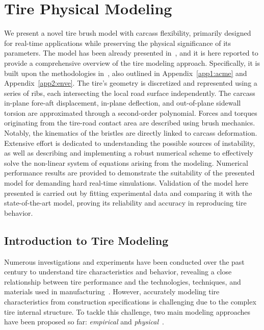 
\chapter{Tire Physical Modeling}
\label{app3:tirex}

We present a novel tire brush model with carcass flexibility, primarily designed for real-time applications while preserving the physical significance of its parameters. The model has been already presented in~\cite{stocco2024physical}, and it is here reported to provide a comprehensive overview of the tire modeling approach. Specifically, it is built upon the methodologies in~\cite{stocco2021acme,stocco2024novel}, also outlined in Appendix~\ref{app1:acme} and Appendix~\ref{app2:enve}. The tire's geometry is discretized and represented using a series of ribs, each intersecting the local road surface independently. The carcass in-plane fore-aft displacement, in-plane deflection, and out-of-plane sidewall torsion are approximated through a second-order polynomial. Forces and torques originating from the tire-road contact area are described using brush mechanics. Notably, the kinematics of the bristles are directly linked to carcass deformation. Extensive effort is dedicated to understanding the possible sources of instability, as well as describing and implementing a robust numerical scheme to effectively solve the non-linear system of equations arising from the modeling. Numerical performance results are provided to demonstrate the suitability of the presented model for demanding hard real-time simulations. Validation of the model here presented is carried out by fitting experimental data and comparing it with the state-of-the-art \MagicFormulae{} model, proving its reliability and accuracy in reproducing tire behavior.


\section{Introduction to Tire Modeling}
\label{app3:sec:introduction}

Numerous investigations and experiments have been conducted over the past century to understand tire characteristics and behavior, revealing a close relationship between tire performance and the technologies, techniques, and materials used in manufacturing~\cite{nakajima2019advanced, gil2020inplane}. However, accurately modeling tire characteristics from construction specifications is challenging due to the complex tire internal structure. To tackle this challenge, two main modeling approaches have been proposed so far: \emph{empirical} and \emph{physical}~\cite{guiggiani2014science, rill2020road, pacejka2012tire, oertel2015years}.

